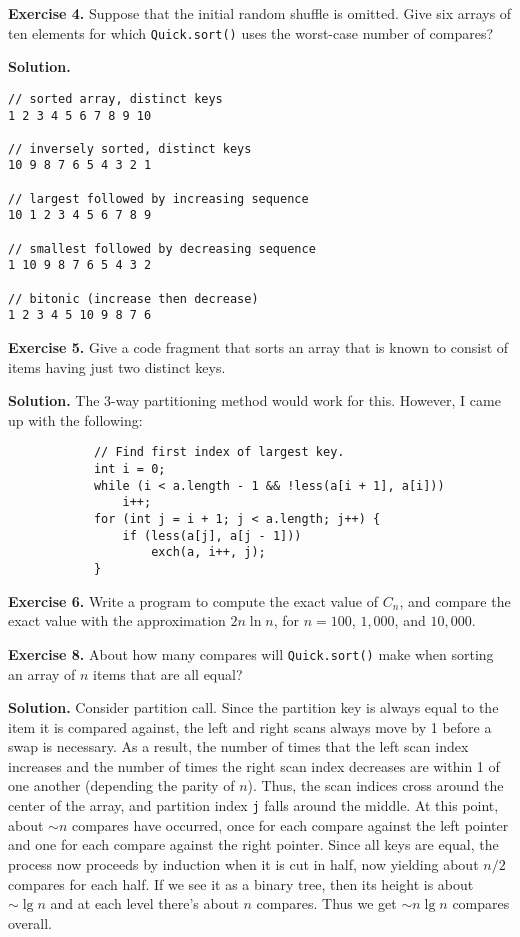 \documentclass[12pt, a4paper]{article}
\newenvironment{ex}[2][Exercise]
{\par\medskip\noindent \textbf{#1 #2.}}
{\medskip}
\newenvironment{sol}[1][Solution]
{\par\medskip\noindent \textbf{#1.} }
{\medskip}
\begin{document}
	\begin{ex}{4}
		Suppose that the initial random shuffle is omitted. Give six arrays of ten elements
		for which \texttt{Quick.sort()} uses the worst-case number of compares?
	\end{ex}
	\begin{sol}
		\begin{lstlisting}[language={}]
// sorted array, distinct keys
1 2 3 4 5 6 7 8 9 10

// inversely sorted, distinct keys
10 9 8 7 6 5 4 3 2 1

// largest followed by increasing sequence
10 1 2 3 4 5 6 7 8 9

// smallest followed by decreasing sequence
1 10 9 8 7 6 5 4 3 2

// bitonic (increase then decrease)
1 2 3 4 5 10 9 8 7 6

		\end{lstlisting}
	\end{sol}
	\begin{ex}{5}
		Give a code fragment that sorts an array that is known to consist of items having
		just two distinct keys.
	\end{ex}
	\begin{sol}
		The 3-way partitioning method would work for this. However, I came up with
		the following:
		\begin{lstlisting}
			// Find first index of largest key.
			int i = 0;
			while (i < a.length - 1 && !less(a[i + 1], a[i]))
				i++;
			for (int j = i + 1; j < a.length; j++) {
				if (less(a[j], a[j - 1]))
					exch(a, i++, j);
			}
		\end{lstlisting}
	\end{sol}
	\begin{ex}{6}
		Write a program to compute the exact value of $C_n$, and compare the exact value
		with the approximation $2n\ln n$, for $n=100$, $1,000$, and $10,000$.
	\end{ex}
	\begin{ex}{8}
		About how many compares will \texttt{Quick.sort()} make when sorting an array of $n$
		items that are all equal?
	\end{ex}
	\begin{sol}
		Consider partition call. Since the partition key is always equal to the item
		it is compared against, the left and right scans always move by 1 before
		a swap is necessary. As a result, the number of times that the left scan
		index increases and the number of times the right scan index decreases are
		within 1 of one another (depending the parity of $n$). Thus, the scan indices
		cross around the center of the array, and partition index \texttt{j} falls
		around the middle. At this point, about $\sim n$ compares have occurred,
		once for each compare against the left pointer and one for each compare
		against the right pointer. Since all keys are equal, the process now proceeds
		by induction when it is cut in half, now yielding about $n/2$ compares for
		each half. If we see it as a binary tree, then its height is about $\sim \lg n$
		and at each level there's about $n$  compares. Thus we get $\sim n\lg n$
		compares overall.
	\end{sol}
\end{document}
